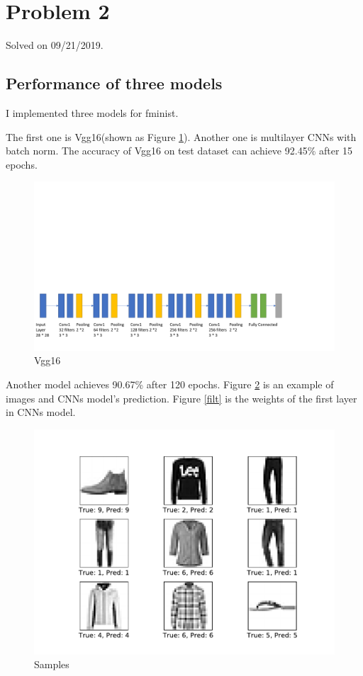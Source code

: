 \documentclass{article}
\begin{document}
\section{Problem 2}
Solved on 09/21/2019. 

\subsection{Performance of three models}
I implemented three models for fminist. 

The first one is Vgg16(shown as Figure \ref{vgg}). Another one is multilayer CNNs with batch norm. The accuracy of Vgg16 on test dataset can achieve 92.45\% after 15 epochs. 
\begin{figure}[!h]
  \centering
  \includegraphics[scale=0.5]{imgs/vgg.pdf}
  \caption{Vgg16}
  \label{vgg}
\end{figure}

Another model achieves 90.67\% after 120 epochs. Figure \ref{res} is an example of images and CNNs model's prediction. Figure \ref{filt} is the weights of the first layer in CNNs model. 
\begin{figure}[!h]
  \centering
  \includegraphics[scale=0.4]{imgs/result.pdf}
  \caption{Samples}
  \label{res}
\end{figure}
\end{document}
